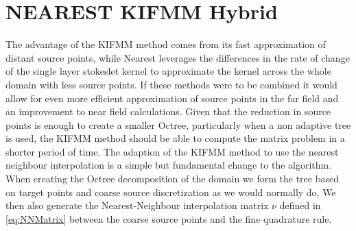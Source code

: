 \section{NEAREST KIFMM Hybrid}
The advantage of the KIFMM method comes from its fast approximation of distant source points, while Nearest leverages the  differences in the rate of change of the single layer stokeslet kernel to approximate the kernel across the whole domain with less source points. If these methods were to be combined it would allow for even more efficient approximation of source points in the far field and an improvement to near field calculations. Given that the reduction in source points is enough to create a smaller Octree, particularly when a non adaptive tree is used, the KIFMM method should be able to compute the matrix problem in a shorter period of time. The adaption of the KIFMM method to use the nearest neighbour interpolation is a simple but fundamental change to the algorithm. When creating the Octree decomposition of the domain we form the tree based on target points and coarse source discretization as we would normally do, We then also generate the Nearest-Neighbour interpolation matrix $\nu$ defined in \cref{eq:NNMatrix} between the coarse source points and the fine quadrature rule.  

